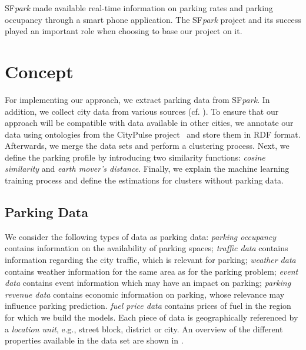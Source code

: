 SF\textit{park} made available real-time information on parking rates and parking occupancy through a smart phone application. The SF\textit{park} project and its success played an important role when choosing to base our project on it.

\section{Concept}
For implementing our approach, we extract parking data from SF\textit{park}. In addition, we collect city data from various sources (cf. ). To ensure that our approach will be compatible with data available in other cities, we annotate our data using ontologies from the CityPulse project~\cite{city_pulse} and store them in RDF format. Afterwards, we merge the data sets and perform a clustering process. Next, we define the parking profile by introducing two similarity functions: \textit{cosine similarity} and \textit{earth mover's distance}.
Finally, we explain the machine learning training process and define the estimations for clusters without parking data.


\subsection{Parking Data}
We consider the following types of data as parking data: \textit{parking occupancy} contains information on the availability of parking spaces; \textit{traffic data} contains information regarding the city traffic, which is relevant for parking; \textit{weather data} contains weather information for the same area as for the parking problem; \textit{event data} contains event information which may have an impact on parking; \textit{parking revenue data} contains economic information on parking, whose relevance may influence parking prediction. \textit{fuel price data} contains prices of fuel in the region for which we build the models.
Each piece of data is geographically referenced by a \textit{location unit}, e.g., street block, district or city. 
An overview of the different properties available in the data set are shown in .

